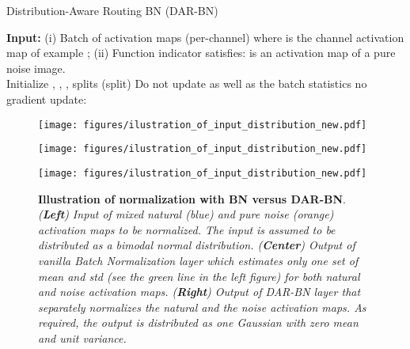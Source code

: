 \documentclass[nohyperref]{article}
\theoremstyle{plain}
\theoremstyle{definition}
\theoremstyle{remark}
\begin{document}
\begin{algorithm}
	\caption{Distribution-Aware Routing BN (DAR-BN)}
	\begin{algorithmic}
		\STATE \textbf{Input:} (i) Batch of activation maps (per-channel)  where  is the channel activation map of example ;
		(ii) Function indicator  satisfies:  is an activation map of a pure noise image.
		\\\hrulefill
		\STATE Initialize , , , 
		\STATE splits  
		\STATE  (split)
		\STATE  
		\STATE 
		\STATE 
		\STATE 
		\STATE 
		\vspace{0.3em}
		\IF {}
		\STATE  Do not update  as well as the batch statistics
		\STATE  no gradient update: 
		\STATE \hspace{1.5em} 
		\ELSE
		\STATE 
		\STATE 
		\STATE 
		\ENDIF
		\ENDFOR
	\end{algorithmic}
	\label{alg:darbn}
\end{algorithm}


\begin{figure}[h!]
    \centering
\begin{minipage}[c]{0.33\linewidth}
    \texttt{[image: figures/ilustration\_of\_input\_distribution\_new.pdf]}
    \end{minipage}
     \hfill
    \begin{minipage}[c]{0.33\linewidth}
    \texttt{[image: figures/ilustration\_of\_input\_distribution\_new.pdf]}
    \end{minipage}
    \hfill
    \begin{minipage}[c]{0.33\linewidth}
    \texttt{[image: figures/ilustration\_of\_input\_distribution\_new.pdf]}
    \end{minipage}
\caption{\textbf{Illustration of normalization with BN versus DAR-BN}. {\it({\textbf{Left}})  Input of mixed natural (blue) and pure noise (orange) activation maps to be normalized. The input is assumed to be distributed as a bimodal normal distribution. ({\textbf{Center}}) Output of vanilla Batch Normalization layer which estimates only one set of mean and std (see the green line in the left figure) for both natural and noise activation maps. ({\textbf{Right}})  Output of DAR-BN layer that separately normalizes the natural and the noise activation maps. As required, the output is distributed as one Gaussian with zero mean and unit variance.}} \label{fig:distribution_shift_ilustraion}
\end{figure}
\end{document}
